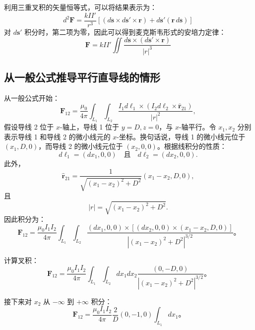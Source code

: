 利用三重叉积的矢量恒等式，可以将结果表示为：
\[
d^{2}\mathbf{F} = \frac{kII'}{r^{3}}\left[\left(d\mathbf{s} \times d\mathbf{s'} \times \mathbf{r}\right) + d\mathbf{s'}(\mathbf{r} \, d\mathbf{s})\right]~
\]
对 \(d\mathbf{s'}\) 积分时，第二项为零，因此可以得到麦克斯韦形式的安培力定律：
\[
\mathbf{F} = kII'\iint \frac{d\mathbf{s} \times (d\mathbf{s'} \times \mathbf{r})}{|r|^{3}}~
\]
\subsection{从一般公式推导平行直导线的情形}
从一般公式开始：
\[
\mathbf{F}_{12} = \frac{\mu_{0}}{4\pi} \int_{L_{1}} \int_{L_{2}} \frac{I_{1} d\boldsymbol{\ell}_{1} \times (I_{2} d\boldsymbol{\ell}_{2} \times \hat{\mathbf{r}}_{21})}{|r|^{2}},~
\]
假设导线 2 位于 \(x\)-轴上，导线 1 位于 \(y=D, z=0\)，与 \(x\)-轴平行。令 \(x_1, x_2\) 分别表示导线 1 和导线 2 的微小线元的 \(x\)-坐标。换句话说，导线 1 的微小线元位于 \((x_1, D, 0)\)，而导线 2 的微小线元位于 \((x_2, 0, 0)\)。根据线积分的性质：
\[
d\boldsymbol{\ell}_1 = (dx_1, 0, 0) \quad \text{且} \quad d\boldsymbol{\ell}_2 = (dx_2, 0, 0).~
\]
此外，
\[
\hat{\mathbf{r}}_{21} = \frac{1}{\sqrt{(x_1-x_2)^2 + D^2}}(x_1-x_2, D, 0),~
\]
且
\[
|r| = \sqrt{(x_1-x_2)^2 + D^2}.~
\]
因此积分为：
\[
\mathbf{F}_{12} = \frac{\mu_0 I_1 I_2}{4\pi} \int_{L_1} \int_{L_2} \frac{(dx_1, 0, 0) \times \left[(dx_2, 0, 0) \times (x_1-x_2, D, 0)\right]}{|(x_1-x_2)^2 + D^2|^{3/2}}。
\]

计算叉积：
\[
\mathbf{F}_{12} = \frac{\mu_0 I_1 I_2}{4\pi} \int_{L_1} \int_{L_2} dx_1 dx_2 \frac{(0, -D, 0)}{|(x_1-x_2)^2 + D^2|^{3/2}}。
\]

接下来对 \(x_2\) 从 \(-\infty\) 到 \(+\infty\) 积分：
\[
\mathbf{F}_{12} = \frac{\mu_0 I_1 I_2}{4\pi} \frac{2}{D}(0, -1, 0) \int_{L_1} dx_1。
\]